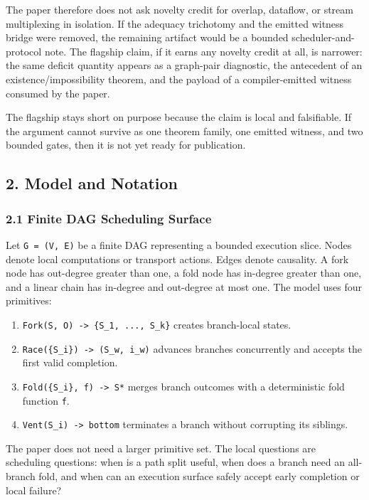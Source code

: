 \documentclass[
  11pt,
]{article}
\providecommand{\tightlist}{%
  \setlength{\itemsep}{0pt}\setlength{\parskip}{0pt}}
\begin{document}
The paper therefore does not ask novelty credit for overlap, dataflow,
or stream multiplexing in isolation. If the adequacy trichotomy and the
emitted witness bridge were removed, the remaining artifact would be a
bounded scheduler-and-protocol note. The flagship claim, if it earns any
novelty credit at all, is narrower: the same deficit quantity appears as
a graph-pair diagnostic, the antecedent of an existence/impossibility
theorem, and the payload of a compiler-emitted witness consumed by the
paper.

The flagship stays short on purpose because the claim is local and
falsifiable. If the argument cannot survive as one theorem family, one
emitted witness, and two bounded gates, then it is not yet ready for
publication.

\subsection{2. Model and Notation}\label{model-and-notation}

\subsubsection{2.1 Finite DAG Scheduling
Surface}\label{finite-dag-scheduling-surface}

Let \texttt{G\ =\ (V,\ E)} be a finite DAG representing a bounded
execution slice. Nodes denote local computations or transport actions.
Edges denote causality. A fork node has out-degree greater than one, a
fold node has in-degree greater than one, and a linear chain has
in-degree and out-degree at most one. The model uses four primitives:

\begin{enumerate}
\def\labelenumi{\arabic{enumi}.}
\tightlist
\item
  \texttt{Fork(S,\ O)\ -\textgreater{}\ \{S\_1,\ ...,\ S\_k\}} creates
  branch-local states.
\item
  \texttt{Race(\{S\_i\})\ -\textgreater{}\ (S\_w,\ i\_w)} advances
  branches concurrently and accepts the first valid completion.
\item
  \texttt{Fold(\{S\_i\},\ f)\ -\textgreater{}\ S*} merges branch
  outcomes with a deterministic fold function \texttt{f}.
\item
  \texttt{Vent(S\_i)\ -\textgreater{}\ bottom} terminates a branch
  without corrupting its siblings.
\end{enumerate}

The paper does not need a larger primitive set. The local questions are
scheduling questions: when is a path split useful, when does a branch
need an all-branch fold, and when can an execution surface safely accept
early completion or local failure?
\end{document}
